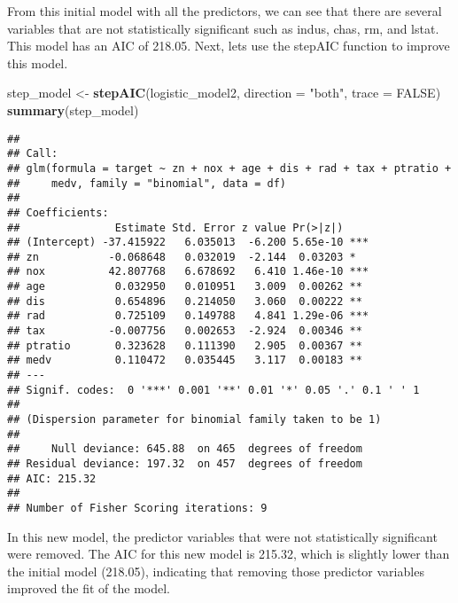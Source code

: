 \documentclass[
]{article}
\newenvironment{Shaded}{\begin{snugshade}}{\end{snugshade}}
\newcommand{\AttributeTok}[1]{\textcolor[rgb]{0.13,0.29,0.53}{#1}}
\newcommand{\ConstantTok}[1]{\textcolor[rgb]{0.56,0.35,0.01}{#1}}
\newcommand{\FunctionTok}[1]{\textcolor[rgb]{0.13,0.29,0.53}{\textbf{#1}}}
\newcommand{\NormalTok}[1]{#1}
\newcommand{\OtherTok}[1]{\textcolor[rgb]{0.56,0.35,0.01}{#1}}
\newcommand{\StringTok}[1]{\textcolor[rgb]{0.31,0.60,0.02}{#1}}
\begin{document}
From this initial model with all the predictors, we can see that there
are several variables that are not statistically significant such as
indus, chas, rm, and lstat. This model has an AIC of 218.05. Next, lets
use the stepAIC function to improve this model.

\begin{Shaded}
\begin{Highlighting}[]
\NormalTok{step\_model }\OtherTok{\textless{}{-}} \FunctionTok{stepAIC}\NormalTok{(logistic\_model2, }\AttributeTok{direction =} \StringTok{"both"}\NormalTok{, }\AttributeTok{trace =} \ConstantTok{FALSE}\NormalTok{)}
\FunctionTok{summary}\NormalTok{(step\_model)}
\end{Highlighting}
\end{Shaded}

\begin{verbatim}
## 
## Call:
## glm(formula = target ~ zn + nox + age + dis + rad + tax + ptratio + 
##     medv, family = "binomial", data = df)
## 
## Coefficients:
##               Estimate Std. Error z value Pr(>|z|)    
## (Intercept) -37.415922   6.035013  -6.200 5.65e-10 ***
## zn           -0.068648   0.032019  -2.144  0.03203 *  
## nox          42.807768   6.678692   6.410 1.46e-10 ***
## age           0.032950   0.010951   3.009  0.00262 ** 
## dis           0.654896   0.214050   3.060  0.00222 ** 
## rad           0.725109   0.149788   4.841 1.29e-06 ***
## tax          -0.007756   0.002653  -2.924  0.00346 ** 
## ptratio       0.323628   0.111390   2.905  0.00367 ** 
## medv          0.110472   0.035445   3.117  0.00183 ** 
## ---
## Signif. codes:  0 '***' 0.001 '**' 0.01 '*' 0.05 '.' 0.1 ' ' 1
## 
## (Dispersion parameter for binomial family taken to be 1)
## 
##     Null deviance: 645.88  on 465  degrees of freedom
## Residual deviance: 197.32  on 457  degrees of freedom
## AIC: 215.32
## 
## Number of Fisher Scoring iterations: 9
\end{verbatim}

In this new model, the predictor variables that were not statistically
significant were removed. The AIC for this new model is 215.32, which is
slightly lower than the initial model (218.05), indicating that removing
those predictor variables improved the fit of the model.
\end{document}
